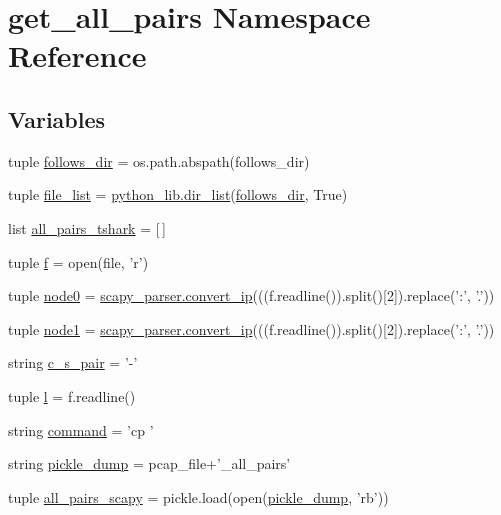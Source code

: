 \hypertarget{namespaceget__all__pairs}{\section{get\-\_\-all\-\_\-pairs Namespace Reference}
\label{namespaceget__all__pairs}
}
\subsection*{Variables}
\begin{DoxyCompactItemize}
\item 
tuple \hyperlink{namespaceget__all__pairs_a1a098ebbb665e47d404618b95a8ea468}{follows\-\_\-dir} = os.\-path.\-abspath(follows\-\_\-dir)
\item 
tuple \hyperlink{namespaceget__all__pairs_ada0a4d6ed4e95218db6dcc5a8291b97a}{file\-\_\-list} = \hyperlink{namespacepython__lib_a32a11ff8ffaca42c9527412287edf0d5}{python\-\_\-lib.\-dir\-\_\-list}(\hyperlink{namespaceget__all__pairs_a1a098ebbb665e47d404618b95a8ea468}{follows\-\_\-dir}, True)
\item 
list \hyperlink{namespaceget__all__pairs_a4c92b8a629bb4f726c383e672521eec4}{all\-\_\-pairs\-\_\-tshark} = \mbox{[}$\,$\mbox{]}
\item 
tuple \hyperlink{namespaceget__all__pairs_ab7236e4617b75a4400777ac08f262963}{f} = open(file, 'r')
\item 
tuple \hyperlink{namespaceget__all__pairs_a50bcbb8a8923b9dac536e87f54f29cce}{node0} = \hyperlink{namespacescapy__parser_ad232477d220b14b000fad3dac1d948a1}{scapy\-\_\-parser.\-convert\-\_\-ip}(((f.\-readline()).split()\mbox{[}2\mbox{]}).replace('\-:', '.'))
\item 
tuple \hyperlink{namespaceget__all__pairs_a8ac2e092f90c8fef4eddc9f665a71f51}{node1} = \hyperlink{namespacescapy__parser_ad232477d220b14b000fad3dac1d948a1}{scapy\-\_\-parser.\-convert\-\_\-ip}(((f.\-readline()).split()\mbox{[}2\mbox{]}).replace('\-:', '.'))
\item 
string \hyperlink{namespaceget__all__pairs_ab8b0605e707bec570403c17de2780a21}{c\-\_\-s\-\_\-pair} = '-\/'
\item 
tuple \hyperlink{namespaceget__all__pairs_ac36fe2b41b860b8d68de2dfc93945951}{l} = f.\-readline()
\item 
string \hyperlink{namespaceget__all__pairs_a15effa0696d56acc16b60bbf458e8b32}{command} = 'cp '
\item 
string \hyperlink{namespaceget__all__pairs_adbdf902a06dba3da9796b4676966b41b}{pickle\-\_\-dump} = pcap\-\_\-file+'\-\_\-all\-\_\-pairs'
\item 
tuple \hyperlink{namespaceget__all__pairs_a3a539e5269b6a98f445e695305ea7d7a}{all\-\_\-pairs\-\_\-scapy} = pickle.\-load(open(\hyperlink{namespaceget__all__pairs_adbdf902a06dba3da9796b4676966b41b}{pickle\-\_\-dump}, 'rb'))
\end{DoxyCompactItemize}


